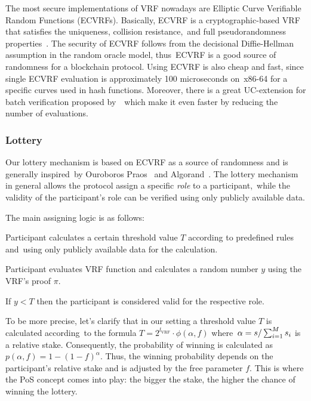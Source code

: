 The most secure implementations of VRF nowadays are Elliptic Curve Verifiable Random Functions (ECVRFs).
Basically, ECVRF is a cryptographic-based VRF that satisfies the uniqueness, collision resistance,\
and full pseudorandomness properties~\cite{cryptoeprint:2014/905}.
The security of ECVRF follows from the decisional Diffie-Hellman assumption in the random oracle model, thus\
ECVRF is a good source of randomness for a blockchain protocol.
Using ECVRF is also cheap and fast, since single ECVRF evaluation is approximately 100 microseconds on\
x86-64 for a specific curves used in hash functions.
Moreover, there is a great UC-extension for batch verification proposed by~\cite{cryptoeprint:2022/1045}\
which make it even faster by reducing the number of evaluations.

\subsubsection{Lottery}
Our lottery mechanism is based on ECVRF as a source of randomness and is generally inspired\
by Ouroboros Praos~\cite{cryptoeprint:2017/573} and Algorand~\cite{cryptoeprint:2017/454}.
The lottery mechanism in general allows the protocol assign a specific \emph{role} to a participant,\
while the validity of the participant's role can be verified using only publicly available data.

The main assigning logic is as follows:
\begin{legal}
    \item Participant calculates a certain threshold value $T$ according to predefined rules and\
    using only publicly available data for the calculation.
    \item Participant evaluates VRF function and calculates a random number $y$ using the VRF's proof $\pi$.
    \item If ${y < T}$ then the participant is considered valid for the respective role.
\end{legal}

To be more precise, let's clarify that in our setting a threshold value $T$ is calculated according\
to the formula ${T = 2^{l_{\text{VRF}}}\cdot \phi(\alpha, f)}$ where\
${\alpha=s/\\\sum_{i=1}^{M} s_i}$ is a relative stake.
Consequently, the probability of winning is calculated as ${p(\alpha, f) = 1-(1-f)^{\alpha}}$.
Thus, the winning probability depends on the participant's relative stake and is adjusted by the free parameter $f$.
This is where the PoS concept comes into play: the bigger the stake, the higher the chance of winning the lottery.

